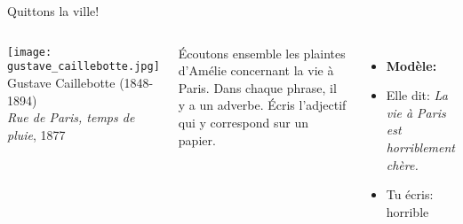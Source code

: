 \begin{frame}{Quittons la ville!}
  \begin{columns}
      \begin{center}
        \small
        \texttt{[image: gustave\_caillebotte.jpg]} \\
        Gustave Caillebotte (1848-1894) \\
        \emph{Rue de Paris, temps de pluie}, 1877
      \end{center}
      Écoutons ensemble les plaintes d'Amélie concernant la vie à Paris.
      Dans chaque phrase, il y a un adverbe.
      Écris l'adjectif qui y correspond sur un papier.
      \begin{itemize}
        \item \textbf{Modèle:}
        \item Elle dit: \emph{La vie à Paris est horriblement chère.}
        \item Tu écris: horrible
      \end{itemize}
  \end{columns}
\end{frame}